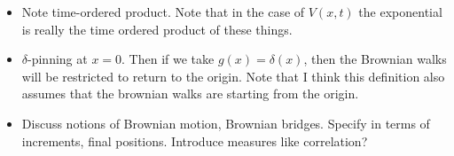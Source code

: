 \begin{itemize}
    or in continuous language:
    \begin{equation}
      f(x,t)= \dlangle e^{-\int_0^t dt'  V[x+W(t')]}f_0[x+W(t)]\drangle
    \end{equation}
  \item Note time-ordered product.
    Note that in the case of $V(x,t)$ the exponential is really the time ordered product of these things.
  \item $\delta$-pinning at $x=0$.  
    Then if we take $g(x) = \delta(x)$, then the Brownian walks will be restricted to return to the origin.
    Note that I think this definition also assumes that the brownian walks are starting from the origin.  
  \item Discuss notions of Brownian motion, Brownian bridges.  Specify in terms of increments,
    final positions.  Introduce measures like correlation?




\end{itemize}
